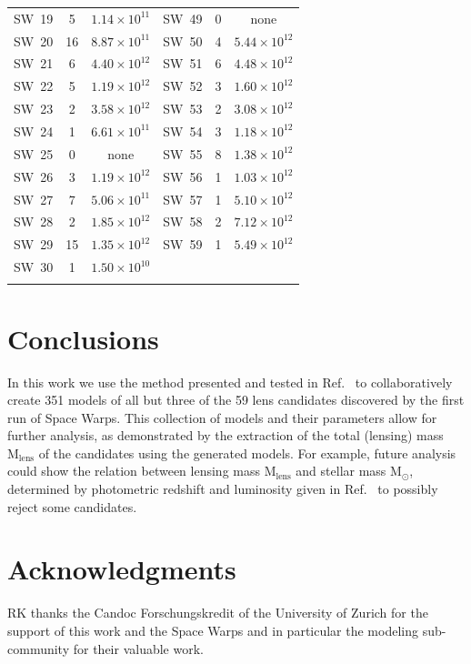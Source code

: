 \documentclass{ws-procs975x65}
\newcommand{\sw}{Space Warps\xspace}
\newcommand{\Msun}{\ensuremath{\text{M}_\odot}\xspace}
\newcommand{\Mlens}{\ensuremath{\text{M}_\text{lens}}\xspace}
\newcommand{\SW}[1]{SW~#1\xspace}
\newcommand{\icite}[1]{Ref.~\refcite{#1}}  %
\begin{document}
\begin{table}
{\begin{tabular} { c  c  c | c  c  c }
\SW{19} & 5 & $1.14 \times 10^{11}$   &   \SW{49} & 0 & none  \\
\SW{20} & 16 & $8.87 \times 10^{11}$  &   \SW{50} & 4 & $5.44 \times 10^{12}$  \\
\SW{21} & 6 & $4.40 \times 10^{12}$   &   \SW{51} & 6 & $4.48 \times 10^{12}$  \\
\SW{22} & 5 & $1.19 \times 10^{12}$   &   \SW{52} & 3 & $1.60 \times 10^{12}$  \\
\SW{23} & 2 & $3.58 \times 10^{12}$   &   \SW{53} & 2 & $3.08 \times 10^{12}$  \\
\SW{24} & 1 & $6.61 \times 10^{11}$   &   \SW{54} & 3 & $1.18 \times 10^{12}$  \\
\SW{25} & 0 & none                    &   \SW{55} & 8 & $1.38 \times 10^{12}$  \\
\SW{26} & 3 & $1.19 \times 10^{12}$   &   \SW{56} & 1 & $1.03 \times 10^{12}$  \\
\SW{27} & 7 & $5.06 \times 10^{11}$   &   \SW{57} & 1 & $5.10 \times 10^{12}$  \\
\SW{28} & 2 & $1.85 \times 10^{12}$   &   \SW{58} & 2 & $7.12 \times 10^{12}$  \\
\SW{29} & 15 & $1.35 \times 10^{12}$  &   \SW{59} & 1 & $5.49 \times 10^{12}$  \\
\SW{30} & 1 & $1.50 \times 10^{10}$   &    & & \\
\botrule
\end{tabular}
}
\label{tab:results}
\end{table}


\section{Conclusions}

In this work we use the method presented and tested in \icite{Kueng2015} to collaboratively create 351 models of all but three of the 59 lens candidates discovered by the first run of \sw.
This collection of models and their parameters allow for further analysis, as demonstrated by the extraction of the total (lensing) mass \Mlens of the candidates using the generated models.
For example, future analysis could show the relation between lensing mass \Mlens and stellar mass \Msun, determined by photometric redshift and luminosity given in \icite{sw2} to possibly reject some candidates.


\section*{Acknowledgments}
RK thanks the Candoc Forschungskredit of the University of Zurich for the support of this work and the \sw and in particular the modeling sub-community for their valuable work.
\end{document}
